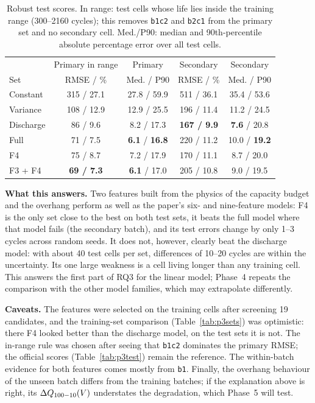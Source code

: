 \begin{table}[t]
\centering
\caption{Robust test scores. In range: test cells whose life lies inside
the training range (300--2160 cycles); this removes \texttt{b1c2} and
\texttt{b2c1} from the primary set and no secondary cell. Med./P90: median
and 90th-percentile absolute percentage error over all test cells.}
\label{tab:p3robust}
\setlength{\tabcolsep}{3pt}
\begin{tabular}{@{}lcccc@{}}
\toprule
& Primary in range & Primary & Secondary & Secondary \\
Set & RMSE / \% & Med. / P90 & RMSE / \% & Med. / P90 \\
\midrule
Constant  & 315 / 27.1 & 27.8 / 59.9 & 511 / 36.1 & 35.4 / 53.6 \\
Variance  & 108 / 12.9 & 12.9 / 25.5 & 196 / 11.4 & 11.2 / 24.5 \\
Discharge & 86 / 9.6   & 8.2 / 17.3  & \textbf{167 / 9.9} & \textbf{7.6} / 20.8 \\
Full      & 71 / 7.5 & \textbf{6.1} / \textbf{16.8} & 220 / 11.2 & 10.0 / \textbf{19.2} \\
F4        & 75 / 8.7   & 7.2 / 17.9  & 170 / 11.1 & 8.7 / 20.0 \\
F3 + F4   & \textbf{69 / 7.3} & \textbf{6.1} / 17.0 & 205 / 10.8 & 9.0 / 19.5 \\
\bottomrule
\end{tabular}
\end{table}

\textbf{What this answers.} Two features built from the physics of the
capacity budget and the overhang perform as well as the paper's six- and
nine-feature models: F4 is the only set close to the best on both test sets,
it beats the full model where that model fails (the secondary batch), and its
test errors change by only 1--3 cycles across random seeds. It does not,
however, clearly beat the discharge model: with about 40 test cells per set,
differences of 10--20 cycles are within the uncertainty. Its one large
weakness is a cell living longer than any training cell. This answers the
first part of RQ3 for the linear model; Phase~4 repeats the comparison with
the other model families, which may extrapolate differently.

\textbf{Caveats.} The features were selected on the training cells after
screening 19 candidates, and the training-set comparison
(Table~\ref{tab:p3sets}) was optimistic: there F4 looked better than the
discharge model, on the test sets it is not. The in-range rule was chosen
after seeing that \texttt{b1c2} dominates the primary RMSE; the official
scores (Table~\ref{tab:p3test}) remain the reference. The within-batch
evidence for both features comes mostly from \texttt{b1}. Finally, the
overhang behaviour of the unseen batch differs from the training batches; if
the explanation above is right, its $\Delta Q_{100-10}(V)$ understates the degradation, which
Phase~5 will test.
